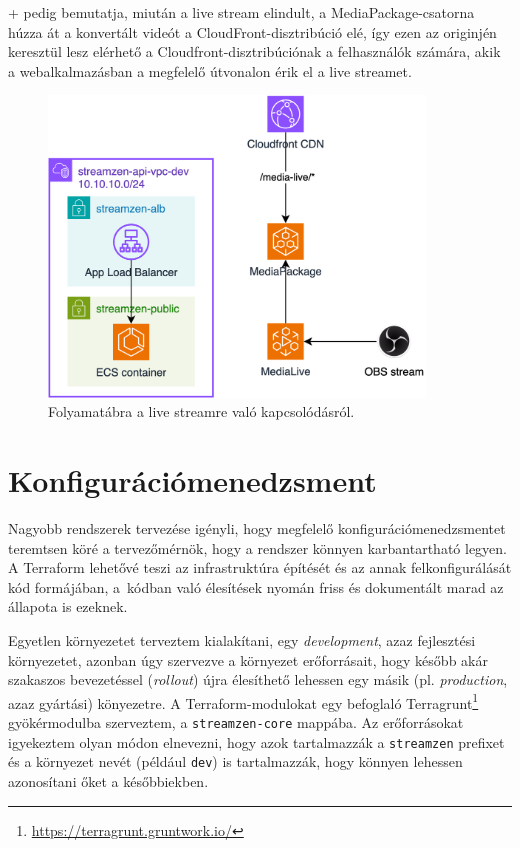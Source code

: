 \Az+ pedig bemutatja, miután a live stream elindult, a MediaPackage-csatorna húzza át a konvertált videót a CloudFront-disztribúció elé, így ezen az originjén keresztül lesz elérhető a Cloudfront-disztribúciónak a felhasználók számára, akik a webalkalmazásban a megfelelő útvonalon érik el a live streamet.

\begin{figure}[h]
	\centering
	\includegraphics[height=80mm, keepaspectratio]{figures/dipterv_live2.png}
	\caption{Folyamatábra a live streamre való kapcsolódásról.}
	\label{fig:live2}
\end{figure}

\section{Konfigurációmenedzsment}\label{sec:config}

Nagyobb rendszerek tervezése igényli, hogy megfelelő konfigurációmenedzsmentet teremtsen köré a tervezőmérnök, hogy a rendszer könnyen karbantartható legyen. A Terraform lehetővé teszi az infrastruktúra építését és az annak felkonfigurálását kód formájában, a~kódban való élesítések nyomán friss és dokumentált marad az állapota is ezeknek.

Egyetlen környezetet terveztem kialakítani, egy \emph{development}, azaz fejlesztési környezetet, azonban úgy szervezve a környezet erőforrásait, hogy később akár szakaszos bevezetéssel (\emph{rollout}) újra élesíthető lehessen egy másik (pl. \emph{production}, azaz gyártási) könyezetre. A Terraform-modulokat egy befoglaló Terragrunt\footnote{\url{https://terragrunt.gruntwork.io/}} gyökérmodulba szerveztem, a \verb|streamzen-core| mappába. Az erőforrásokat igyekeztem olyan módon elnevezni, hogy azok tartalmazzák a \verb|streamzen| prefixet és a környezet nevét (például \verb|dev|) is tartalmazzák, hogy könnyen lehessen azonosítani őket a későbbiekben.

